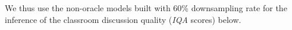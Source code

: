 \documentclass[runningheads]{llncs}
\begin{document}
We thus
use the non-oracle models built with 60\% downsampling rate for the inference of the classroom discussion quality (\textit{IQA}  scores) below.
\end{document}
